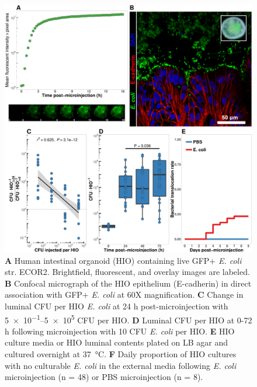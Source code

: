 \documentclass[9pt,lineo]{elife}
\begin{document}
\begin{figure}
\begin{fullwidth}
\includegraphics[width=0.95\linewidth]{./figures/figure1/figure1_multipanel.pdf}
\caption{\textbf{A} Human intestinal organoid (HIO) containing live GFP+ \textit{E. coli} str. ECOR2. Brightfield, fluorescent, and overlay images are labeled. \textbf{B} Confocal micrograph of the HIO epithelium (E-cadherin) in direct association with GFP+ \textit{E. coli} at 60X magnification. \textbf{C} Change in luminal CFU per HIO \textit{E. coli} at 24 h post-microinjection with \numrange{5e-1}{5e5} CFU per HIO. \textbf{D} Luminal CFU per HIO at 0-72 h following microinjection with 10 CFU \textit{E. coli} per HIO. \textbf{E} HIO culture media or HIO luminal contents plated on LB agar and cultured overnight at \SI{37}{\celsius}. \textbf{F} Daily proportion of HIO cultures with no culturable \textit{E. coli} in the external media following \textit{E. coli} microinjection (n = 48) or PBS microinjection (n = 8).}
\label{fig:fullwidth}
\end{fullwidth}
\end{figure}
\end{document}
